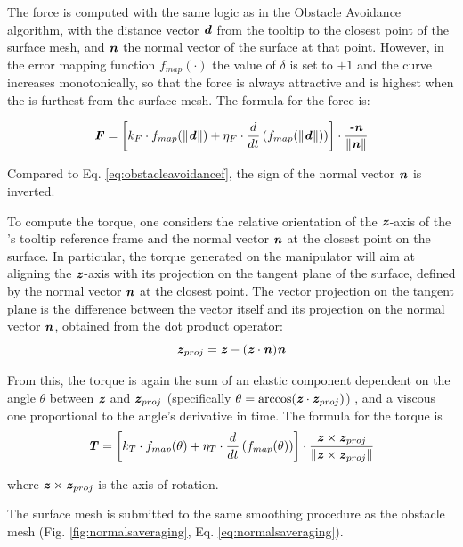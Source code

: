 \documentclass[../main.tex]{subfiles}
\begin{document}
The force is computed with the same logic as in the Obstacle Avoidance algorithm, with the distance vector $\textbf{\textit{d}}$ from the \psm tooltip to the closest point of the surface mesh, and $\textbf{\textit{n}}$ the normal vector of the surface at that point. However, in the error mapping function $f_{map}(\cdot)$ the value of $\delta$ is set to $+1$ and the curve increases monotonically, so that the force is always attractive and is highest when the \psm is furthest from the surface mesh. The formula for the force is:

\begin{equation}
    \textbf{\textit{F}} = \left[k_F\cdot f_{map}(\|\textbf{\textit{d}}\|) + \eta_F\cdot \frac{d}{dt} \left( f_{map}(\|\textbf{\textit{d}}\|)\right)\right]\cdot \frac{\textbf{\textit{-n}}}{\|\textbf{\textit{n}}\|} 
\end{equation}

Compared to Eq. \ref{eq:obstacleavoidancef}, the sign of the normal vector $\textbf{\textit{n}}$ is inverted.

To compute the torque, one considers the relative orientation of the $\textbf{\textit{z}}$-axis of the \psm's tooltip reference frame and the normal vector $\textbf{\textit{n}}$ at the closest point on the surface. In particular, the torque generated on the manipulator will aim at aligning the $\textbf{\textit{z}}$-axis with its projection on the tangent plane of the surface, defined by the normal vector $\textbf{\textit{n}}$ at the closest point. The vector projection on the tangent plane is the difference between the vector itself and its projection on the normal vector $\textbf{\textit{n}}$, obtained from the dot product operator:
\begin{equation}
    \textbf{\textit{z}}_{proj} = \textbf{\textit{z}} - (\textbf{\textit{z}}\cdot\textbf{\textit{n}})\textbf{\textit{n}}
\end{equation} 

From this, the torque is again the sum of an elastic component dependent on the angle $\theta$ between $\textbf{\textit{z}}$ and $\textbf{\textit{z}}_{proj}$ (specifically $\theta = \arccos(\textbf{\textit{z}}\cdot\textbf{\textit{z}}_{proj})$) , and a viscous one proportional to the angle's derivative in time. The formula for the torque is
\begin{equation}
    \textbf{\textit{T}} = \left[k_T\cdot f_{map}(\theta) + \eta_T\cdot \frac{d}{dt} \left( f_{map}(\theta)\right)\right]\cdot \frac{\textbf{\textit{z}} \times \textbf{\textit{z}}_{proj}}{\|\textbf{\textit{z}} \times \textbf{\textit{z}}_{proj}\|}
    \label{eq:}
\end{equation}

where $\textbf{\textit{z}} \times \textbf{\textit{z}}_{proj}$ is the axis of rotation.

The surface mesh is submitted to the same smoothing procedure as the obstacle mesh (Fig. \ref{fig:normalsaveraging}, Eq. \ref{eq:normalsaveraging}).
\end{document}
